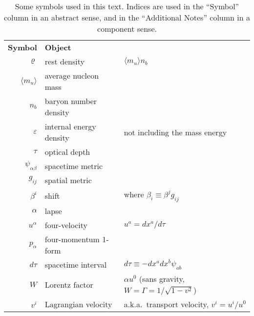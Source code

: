 \begin{table}
  \centering
  \begin{tabular}{rll}
    \textbf{Symbol}       & \textbf{Object}           & \\%
    $\varrho$             & rest density              & $\langle m_u \rangle n_b $ \\
    $\langle m_u \rangle$ & average nucleon mass      & \\
    $n_b$                 & baryon number density     & \\
    $\varepsilon$         & internal energy density   & not including the mass energy \\
    $\tau$                & optical depth             & \\
    $\psi_{\alpha\beta}$  & spacetime metric          & \\
    $g_{ij}$              & spatial metric            & \\
    $\beta^i$             & shift                     & where $\beta_i \equiv \beta^j g_{ij}$ \\
    $\alpha$              & lapse                     & \\
    $u^\alpha$            & four-velocity             & $u^a=dx^a/d\tau$ \\
    $p_\alpha$            & four-momentum 1-form      & \\
    $d\tau$               & spacetime interval        & $d\tau\equiv-dx^a dx^b \psi_{ab}$ \\
    $W$                   & Lorentz factor            & $\alpha u^0$ (sans gravity, $W=\Gamma=1/\sqrt{1-v^2}$) \\
    $v^i$                 & Lagrangian velocity       & a.k.a.\ transport velocity, $v^i=u^i/u^0$ \\
  \end{tabular}
  \caption{
    Some symbols used in this text.
    Indices are used in the ``Symbol'' column in an abstract sense, and in the
    ``Additional Notes'' column in a component sense.
  }
  \label{tab:conventions}
\end{table}
